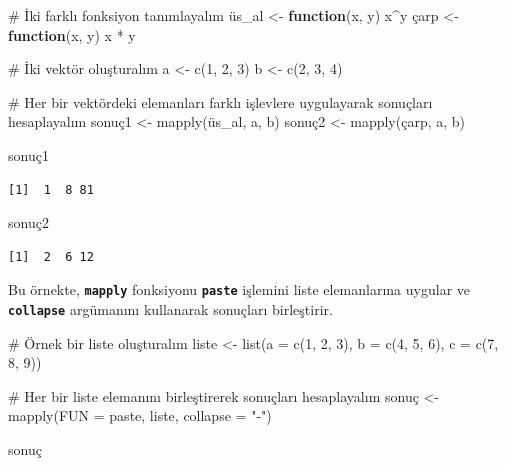 \documentclass[
  letterpaper,
  DIV=11,
  numbers=noendperiod]{scrreprt}
\newenvironment{Shaded}{\begin{snugshade}}{\end{snugshade}}
\newcommand{\AttributeTok}[1]{\textcolor[rgb]{0.40,0.45,0.13}{#1}}
\newcommand{\CommentTok}[1]{\textcolor[rgb]{0.37,0.37,0.37}{#1}}
\newcommand{\ControlFlowTok}[1]{\textcolor[rgb]{0.00,0.23,0.31}{\textbf{#1}}}
\newcommand{\DecValTok}[1]{\textcolor[rgb]{0.68,0.00,0.00}{#1}}
\newcommand{\FunctionTok}[1]{\textcolor[rgb]{0.28,0.35,0.67}{#1}}
\newcommand{\NormalTok}[1]{\textcolor[rgb]{0.00,0.23,0.31}{#1}}
\newcommand{\OtherTok}[1]{\textcolor[rgb]{0.00,0.23,0.31}{#1}}
\newcommand{\SpecialCharTok}[1]{\textcolor[rgb]{0.37,0.37,0.37}{#1}}
\newcommand{\StringTok}[1]{\textcolor[rgb]{0.13,0.47,0.30}{#1}}
\begin{document}
\begin{Shaded}
\begin{Highlighting}[]
\CommentTok{\# İki farklı fonksiyon tanımlayalım}
\NormalTok{üs\_al }\OtherTok{\textless{}{-}} \ControlFlowTok{function}\NormalTok{(x, y) x}\SpecialCharTok{\^{}}\NormalTok{y}
\NormalTok{çarp }\OtherTok{\textless{}{-}} \ControlFlowTok{function}\NormalTok{(x, y) x }\SpecialCharTok{*}\NormalTok{ y}

\CommentTok{\# İki vektör oluşturalım}
\NormalTok{a }\OtherTok{\textless{}{-}} \FunctionTok{c}\NormalTok{(}\DecValTok{1}\NormalTok{, }\DecValTok{2}\NormalTok{, }\DecValTok{3}\NormalTok{)}
\NormalTok{b }\OtherTok{\textless{}{-}} \FunctionTok{c}\NormalTok{(}\DecValTok{2}\NormalTok{, }\DecValTok{3}\NormalTok{, }\DecValTok{4}\NormalTok{)}

\CommentTok{\# Her bir vektördeki elemanları farklı işlevlere uygulayarak sonuçları hesaplayalım}
\NormalTok{sonuç1 }\OtherTok{\textless{}{-}} \FunctionTok{mapply}\NormalTok{(üs\_al, a, b)}
\NormalTok{sonuç2 }\OtherTok{\textless{}{-}} \FunctionTok{mapply}\NormalTok{(çarp, a, b)}

\NormalTok{sonuç1}
\end{Highlighting}
\end{Shaded}

\begin{verbatim}
[1]  1  8 81
\end{verbatim}

\begin{Shaded}
\begin{Highlighting}[]
\NormalTok{sonuç2}
\end{Highlighting}
\end{Shaded}

\begin{verbatim}
[1]  2  6 12
\end{verbatim}

Bu örnekte, \textbf{\texttt{mapply}} fonksiyonu \textbf{\texttt{paste}}
işlemini liste elemanlarına uygular ve \textbf{\texttt{collapse}}
argümanını kullanarak sonuçları birleştirir.

\begin{Shaded}
\begin{Highlighting}[]
\CommentTok{\# Örnek bir liste oluşturalım}
\NormalTok{liste }\OtherTok{\textless{}{-}} \FunctionTok{list}\NormalTok{(}\AttributeTok{a =} \FunctionTok{c}\NormalTok{(}\DecValTok{1}\NormalTok{, }\DecValTok{2}\NormalTok{, }\DecValTok{3}\NormalTok{), }\AttributeTok{b =} \FunctionTok{c}\NormalTok{(}\DecValTok{4}\NormalTok{, }\DecValTok{5}\NormalTok{, }\DecValTok{6}\NormalTok{), }\AttributeTok{c =} \FunctionTok{c}\NormalTok{(}\DecValTok{7}\NormalTok{, }\DecValTok{8}\NormalTok{, }\DecValTok{9}\NormalTok{))}

\CommentTok{\# Her bir liste elemanını birleştirerek sonuçları hesaplayalım}
\NormalTok{sonuç }\OtherTok{\textless{}{-}} \FunctionTok{mapply}\NormalTok{(}\AttributeTok{FUN =}\NormalTok{ paste, liste, }\AttributeTok{collapse =} \StringTok{"{-}"}\NormalTok{)}

\NormalTok{sonuç}
\end{Highlighting}
\end{Shaded}
\end{document}
